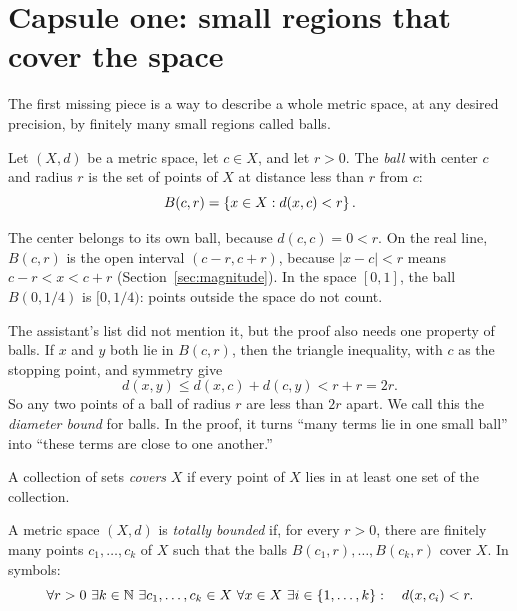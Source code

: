 \section{Capsule one: small regions that cover the space}\label{ch17:sec:balls}
The first missing piece is a way to describe a whole metric space, at any desired precision, by finitely many small regions called balls.

\par\noindent\begin{minipage}{\linewidth}
\begin{definition}[Ball]\label{ch17:def:ball}
Let $(X,d)$ be a metric space, let $c\in X$, and let $r>0$. The \emph{ball} with center $c$ and radius $r$ is the set of points of $X$ at distance less than $r$ from $c$:
\[
 B(c,r)=\left\{x\in X:d(x,c)<r\right\}.
\]
\end{definition}
\end{minipage}\par

The center belongs to its own ball, because $d(c,c)=0<r$. On the real line, $B(c,r)$ is the open interval $(c-r,c+r)$, because $|x-c|<r$ means $c-r<x<c+r$ (Section~\ref{sec:magnitude}). In the space $[0,1]$, the ball $B(0,1/4)$ is $[0,1/4)$: points outside the space do not count.

The assistant's list did not mention it, but the proof also needs one property of balls. If $x$ and $y$ both lie in $B(c,r)$, then the triangle inequality, with $c$ as the stopping point, and symmetry give
\[
 d(x,y)\le d(x,c)+d(c,y)<r+r=2r.
\]
So any two points of a ball of radius $r$ are less than $2r$ apart. We call this the \emph{diameter bound} for balls. In the proof, it turns ``many terms lie in one small ball'' into ``these terms are close to one another.''

A collection of sets \emph{covers} $X$ if every point of $X$ lies in at least one set of the collection.

\par\noindent\begin{minipage}{\linewidth}
\begin{definition}\label{ch17:def:totally-bounded}
A metric space $(X,d)$ is \emph{totally bounded} if, for every $r>0$, there are finitely many points $c_1,\ldots,c_k$ of $X$ such that the balls $B(c_1,r),\ldots,B(c_k,r)$ cover $X$. In symbols:
\[
 \forall r>0\ \exists k\in\mathbb N\ \exists c_1,\ldots,c_k\in X\ \forall x\in X\ \exists i\in\left\{1,\ldots,k\right\}:\quad d(x,c_i)<r.
\]
\end{definition}
\end{minipage}\par

